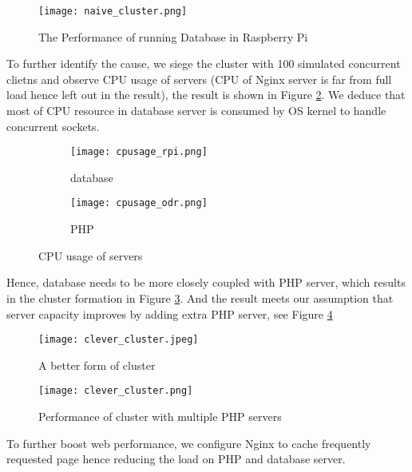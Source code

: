 \begin{figure}[htbp]
\centering
\texttt{[image: naive\_cluster.png]}
\caption{The Performance of running Database in Raspberry Pi}
\label{naive_cluster}
\end{figure}

To further identify the cause, we siege the cluster with 100 simulated concurrent clietns and observe CPU usage of servers (CPU of Nginx server is far from full load hence left out in the result), the result is shown in Figure \ref{cpu_usage}. We deduce that most of CPU resource in database server is consumed by OS kernel to handle concurrent sockets.
\begin{figure}[htbp]
\centering
\begin{subfigure}{0.45\textwidth}
\centering
\texttt{[image: cpusage\_rpi.png]}
\caption{database}
\end{subfigure}
\begin{subfigure}{0.45\textwidth}
\centering
\texttt{[image: cpusage\_odr.png]}
\caption{PHP}
\end{subfigure}
\caption{CPU usage of servers}
\label{cpu_usage}
\end{figure}
Hence, database needs to be more closely coupled with PHP server, which results in the cluster formation in Figure \ref{good_cluster}. And the result meets our assumption that server capacity improves by adding extra PHP server, see Figure \ref{good_cluster_perf}
\begin{figure}[htbp]
\centering
\texttt{[image: clever\_cluster.jpeg]}
\caption{A better form of cluster}
\label{good_cluster}
\end{figure}
\begin{figure}[htbp]
\centering
\texttt{[image: clever\_cluster.png]}
\caption{Performance of cluster with multiple PHP servers}
\label{good_cluster_perf}
\end{figure}

To further boost web performance, we configure Nginx to cache frequently requested page hence reducing the load on PHP and database server.



